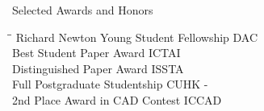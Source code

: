 
\begin{rSection}{Selected Awards and Honors}
\begin{tabbing}
\hspace{3.6in}\= \hspace{2.1in}\= \kill
Richard Newton Young Student Fellowship    \> DAC  \\
Best Student Paper Award                       \> ICTAI                       \\
Distinguished Paper Award                      \>ISSTA                      \\
Full Postgraduate Studentship   \>CUHK  -\\
     2nd Place Award in CAD Contest               \> ICCAD                       \\


\end{tabbing}
\end{rSection}
